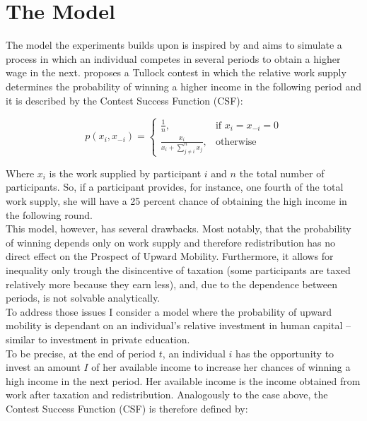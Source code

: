 \chapter{The Model}
\label{ch:model}
\thispagestyle{fancy}

The model the experiments builds upon is inspired by \cite{koch2017} and aims to simulate a process in which an individual competes in several periods to obtain a higher wage in the next. \cite{koch2017} proposes a Tullock contest in which the relative work supply determines the probability of winning a higher income in the following period and it is described by the Contest Success Function (CSF):

\begin{equation}
    p(x_i,x_{-i}) =
\begin{cases}
    \frac{1}{n},& \text{if } x_i = x_{-i} = 0\\
    \frac{x_i}{x_i + \sum_{j\neq i}^n x_{j}},              & \text{otherwise}
\end{cases}
\label{eq:csf}    
\end{equation}

\hfill \break

Where $x_i$ is the work supplied by participant $i$ and $n$ the total number of participants. So, if a participant provides, for instance, one fourth of the total work supply, she will have a 25 percent chance of obtaining the high income in the following round.\\

This model, however, has several drawbacks. Most notably, that the probability of winning depends only on work supply and therefore redistribution has no direct effect on the Prospect of Upward Mobility. Furthermore, it allows for inequality only trough the disincentive of taxation (some participants are taxed relatively more because they earn less), and, due to the dependence between periods, is not solvable analytically.\\ 

To address those issues I consider a model where the probability of upward mobility is dependant on an individual's relative investment in human capital –similar to investment in private education.\\ 

To be precise, at the end of period $t$, an individual $i$ has the opportunity to invest an amount $I$ of her available income to increase her chances of winning a high income in the next period. Her available income is the income obtained from work after taxation and redistribution. Analogously to the case above, the Contest Success Function (CSF) is therefore defined by:


